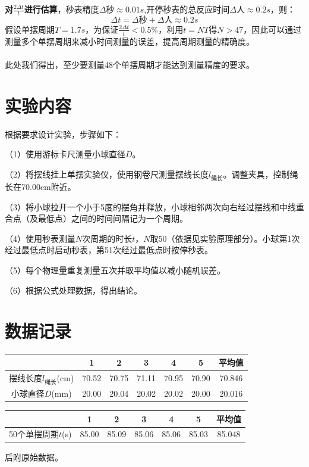 \documentclass[12pt,a4paper]{article}
\begin{document}
	\textbf{对\( \frac{2\Delta t}{t} \)进行估算}，秒表精度$\Delta \text{秒} \approx 0.01s$,开停秒表的总反应时间$\Delta \text{人} \approx 0.2s$，则：\[ \Delta t = \Delta \text{秒} + \Delta \text{人} \approx 0.2s \]
	假设单摆周期$T = 1.7s$，为保证\( \frac{2\Delta t}{t} < 0.5 \% \)，利用$t = NT$得$N>47$，因此可以通过测量多个单摆周期来减小时间测量的误差，提高周期测量的精确度。
	\\
	\\
	此处我们得出，至少要测量48个单摆周期才能达到测量精度的要求。
	
	
	\section{实验内容}
	根据要求设计实验，步骤如下：
	
	（1）使用游标卡尺测量小球直径$D$。
	
	（2）将摆线挂上单摆实验仪，使用钢卷尺测量摆线长度$l_{\text{绳长}}$。调整夹具，控制绳长在70.00cm附近。
		
	（3）将小球拉开一个小于5度的摆角并释放，小球相邻两次向右经过摆线和中线重合点（及最低点）之间的时间间隔记为一个周期。
	
	（4）使用秒表测量$N$次周期的时长$t$，$N$取50（依据见实验原理部分）。小球第1次经过最低点时启动秒表，第51次经过最低点时按停秒表。
	
	（5）每个物理量重复测量五次并取平均值以减小随机误差。
	
	（6）根据公式处理数据，得出结论。
	
	\section{数据记录}
	\begin{center}
		\begin{tabular}{|c|c|c|c|c|c|c|}
		\hline
		 & 1 & 2 & 3 & 4 & 5 & 平均值 \\
		\hline
		摆线长度$l_{\text{绳长}}$(cm) & 70.52 & 70.75 & 71.11 & 70.95 & 70.90 & 70.846 \\
		\hline
		小球直径$D$(mm) & 20.00 & 20.04 & 20.02 & 20.02 & 20.00 & 20.016 \\
		\hline
		\end{tabular}
	\end{center}
	
	\begin{center}
		\begin{tabular}{|c|c|c|c|c|c|c|}
			\hline
			& 1 & 2 & 3 & 4 & 5 & 平均值 \\
			\hline
			50个单摆周期$t$(s) & 85.00 & 85.09 & 85.06 & 85.06 & 85.03 & 85.048 \\
			\hline
		\end{tabular}
	\end{center}
	后附原始数据。
	
\end{document}
